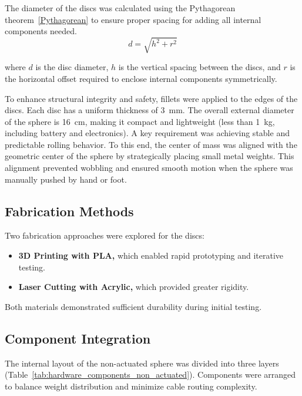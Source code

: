 \documentclass[english, bachelor, utf8]{base/thesis_telematics}
\begin{document}
The diameter of the discs was calculated using the Pythagorean theorem~\ref{Pythagorean} to ensure proper spacing for adding all internal components needed.
\begin{equation}
    d = \sqrt{h^2 + r^2} \label{Pythagorean}
\end{equation}


\noindent
where $d$ is the disc diameter, $h$ is the vertical spacing between the discs, and $r$ is the horizontal offset required to enclose internal components symmetrically.

To enhance structural integrity and safety, fillets were applied to the edges of the discs. 
Each disc has a uniform thickness of \SI{3}{\milli\meter}.
The overall external diameter of the sphere is \SI{16}{\centi\meter}, making it compact and lightweight (less than \SI{1}{\kilo\gram}, including battery and electronics).
A key requirement was achieving stable and predictable rolling behavior. 
To this end, the center of mass was aligned with the geometric center of the sphere by strategically placing small metal weights. 
This alignment prevented wobbling and ensured smooth motion when the sphere was manually pushed by hand or foot.

\subsection{Fabrication Methods}
Two fabrication approaches were explored for the discs:
\begin{itemize}
    \item \textbf{3D Printing with PLA,} which enabled rapid prototyping and iterative testing.
    \item \textbf{Laser Cutting with Acrylic,} which provided greater rigidity.
\end{itemize}
Both materials demonstrated sufficient durability during initial testing.

\subsection{Component Integration}
The internal layout of the non-actuated sphere was divided into three layers (Table~\ref{tab:hardware_components_non_actuated}).
Components were arranged to balance weight distribution and minimize cable routing complexity.
\end{document}
